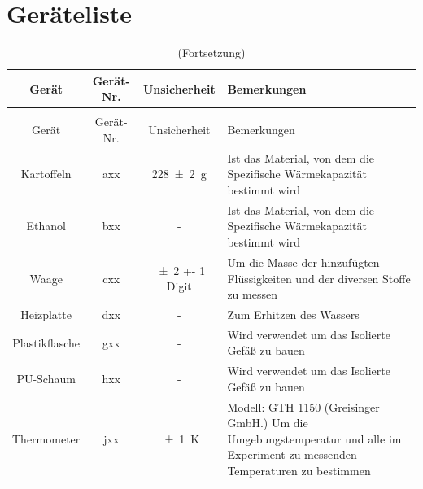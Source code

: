 \documentclass[11pt, ngerman]{scrartcl}
\begin{document}
\section{Geräteliste}
\label{sec:geraeteliste}
\begin{longtable}{c|c|S|p{19em}}
	\caption[Geräteliste]{Verwendete Geräte \label{tab:geraeteliste}}                                                                                                                               \\  %
	\toprule
	Gerät          & Gerät-Nr. & { Unsicherheit }                    & Bemerkungen                                                                                                                  \\
	\midrule
	\endfirsthead
	\caption[]{(Fortsetzung)}                                                                                                                                                                       \\
	\toprule
	Gerät          & Gerät-Nr. & { Unsicherheit }                    & Bemerkungen                                                                                                                  \\
	\midrule
	\endhead
	\endfoot
	\endlastfoot

	Kartoffeln     & axx       & \SI{228(2)}{\g}                     & Ist das Material, von dem die Spezifische Wärmekapazität bestimmt wird                                                       \\ \hline
	Ethanol        & bxx       & { - }                               & Ist das Material, von dem die Spezifische Wärmekapazität bestimmt wird                                                       \\ \hline
	Waage          & cxx       & \SI{+-2}{\permille} +- 1 {Digit}    & Um die Masse der hinzufügten Flüssigkeiten und der diversen Stoffe zu messen                                                 \\ \hline
	Heizplatte     & dxx       & { - }                               & Zum Erhitzen des Wassers                                                                                                     \\ \hline
	Plastikflasche & gxx       & { - }                               & Wird verwendet um das Isolierte Gefäß zu bauen                                                                               \\ \hline
	PU-Schaum      & hxx       & { - }                               & Wird verwendet um das Isolierte Gefäß zu bauen                                                                               \\ \hline
	Thermometer    & jxx       & \SI{+-1}{\kelvin}\cite{thermometer} & Modell: GTH 1150 (Greisinger GmbH.) Um die Umgebungstemperatur und alle im Experiment zu messenden Temperaturen zu bestimmen \\ \hline

	\hline
\end{longtable}
\end{document}
